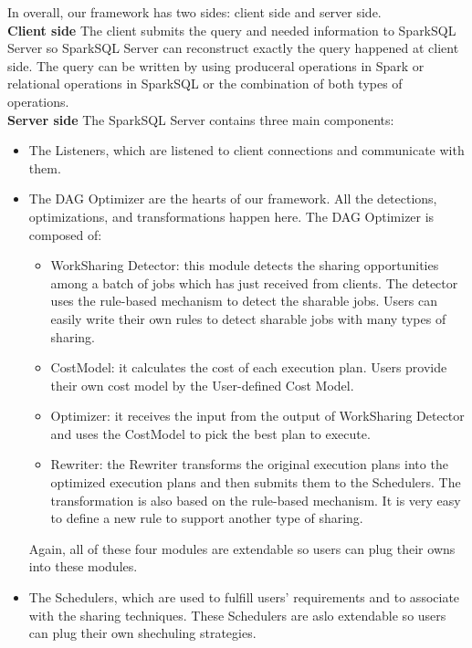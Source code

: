 In overall, our framework has two sides: client side and server side.\\
\textbf{Client side} The client submits the query and needed information to SparkSQL Server so SparkSQL Server can reconstruct exactly the query happened at client side. The query can be written by using produceral operations in Spark or relational operations in SparkSQL or the combination of both types of operations.\\
\textbf{Server side}  The SparkSQL Server contains three main components:\\
\begin{itemize}
\item The Listeners, which are listened to client connections and communicate with them.
\item The DAG Optimizer are the hearts of our framework. All the detections, optimizations, and transformations happen here. The DAG Optimizer is composed of:
\begin{itemize}
\item WorkSharing Detector: this module detects the sharing opportunities among a batch of jobs which has just received from clients. The detector uses the rule-based mechanism to detect the sharable jobs. Users can easily write their own rules to detect sharable jobs with many types of sharing.
\item CostModel: it calculates the cost of each execution plan. Users provide their own cost model by the User-defined Cost Model.
\item Optimizer: it receives the input from the output of WorkSharing Detector and uses the CostModel to pick the best plan to execute.
\item Rewriter: the Rewriter transforms the original execution plans into the optimized execution plans and then submits them to the Schedulers. The transformation is also based on the rule-based mechanism. It is very easy to define a new rule to support another type of sharing.
\end{itemize} 
Again, all of these four modules are extendable so users can plug their owns into these modules.
\item The Schedulers, which are used to fulfill users' requirements and to associate with the sharing techniques. These Schedulers are aslo extendable so users can plug their own shechuling strategies.
\end{itemize}


